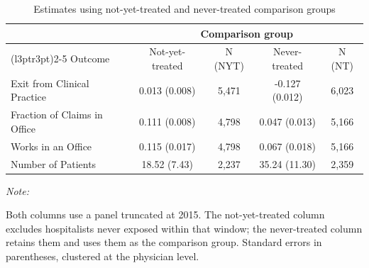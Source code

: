 \begin{table}[ht!]
\centering
\caption{\label{tab:nt_estimates}Estimates using not-yet-treated and never-treated comparison groups}
\centering
\begin{threeparttable}
\begin{tabular}[t]{lcccc}
\toprule
\multicolumn{1}{c}{ } & \multicolumn{4}{c}{Comparison group} \\
\cmidrule(l{3pt}r{3pt}){2-5}
Outcome & Not-yet-treated & N (NYT) & Never-treated & N (NT)\\
\midrule
Exit from Clinical Practice & 0.013 (0.008) & 5,471 & -0.127 (0.012) & 6,023\\
Fraction of Claims in Office & 0.111 (0.008) & 4,798 & 0.047 (0.013) & 5,166\\
Works in an Office & 0.115 (0.017) & 4,798 & 0.067 (0.018) & 5,166\\
Number of Patients & 18.52 (7.43) & 2,237 & 35.24 (11.30) & 2,359\\
\bottomrule
\end{tabular}
\begin{tablenotes}
\item \textit{Note: } 
\item Both columns use a panel truncated at 2015. The not-yet-treated column excludes hospitalists never exposed within that window; the never-treated column retains them and uses them as the comparison group. Standard errors in parentheses, clustered at the physician level.
\end{tablenotes}
\end{threeparttable}
\end{table}
